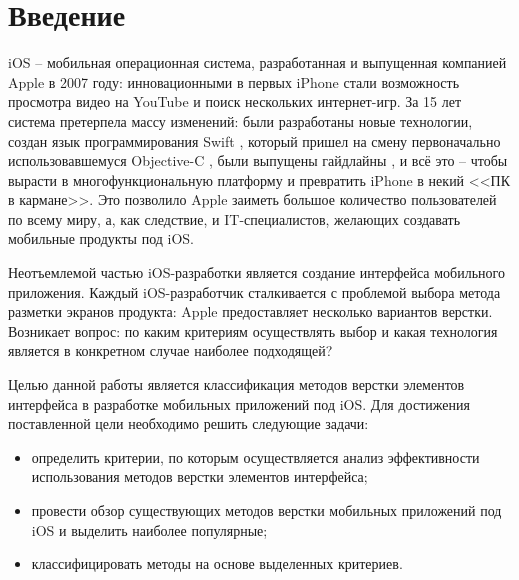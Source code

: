 \chapter*{Введение}

iOS \cite{ios} -- мобильная операционная система, разработанная и выпущенная компанией Apple \cite{apple} в 2007 году: инновационными в первых iPhone \cite{iphone} стали возможность просмотра видео на YouTube \cite{youtube} и поиск нескольких интернет-игр. За 15 лет система претерпела массу изменений: были разработаны новые технологии, создан язык программирования Swift \cite{swift}, который пришел на смену первоначально использовавшемуся Objective-C \cite{objc}, были выпущены гайдлайны \cite{hig}, и всё это -- чтобы вырасти в многофункциональную платформу и превратить iPhone в некий <<ПК в кармане>>. Это позволило Apple заиметь большое количество пользователей по всему миру, а, как следствие, и IT-специалистов, желающих создавать мобильные продукты под iOS. 

Неотъемлемой частью iOS-разработки является создание интерфейса мобильного приложения. Каждый iOS-разработчик сталкивается с проблемой выбора метода разметки экранов продукта: Apple предоставляет несколько вариантов верстки. Возникает вопрос: по каким критериям осуществлять выбор и какая технология является в конкретном случае наиболее подходящей?

Целью данной работы является классификация методов верстки элементов интерфейса в разработке мобильных приложений под iOS. Для достижения поставленной цели необходимо решить следующие задачи: 

\begin{itemize}[label=---]
	\item определить критерии, по которым осуществляется анализ эффективности использования методов верстки элементов интерфейса;
	\item провести обзор существующих методов верстки мобильных приложений под iOS и выделить наиболее популярные;
	\item классифицировать методы на основе выделенных критериев.
\end{itemize}

